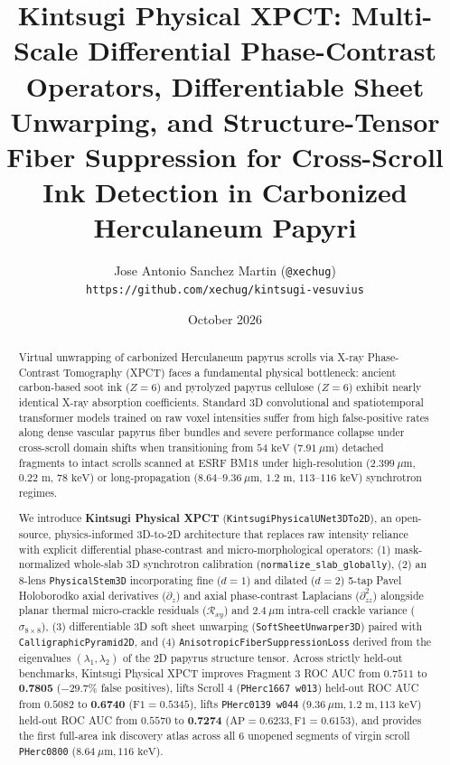 \documentclass[11pt,a4paper]{article}
\title{\textbf{Kintsugi Physical XPCT: Multi-Scale Differential Phase-Contrast Operators, Differentiable Sheet Unwarping, and Structure-Tensor Fiber Suppression for Cross-Scroll Ink Detection in Carbonized Herculaneum Papyri}}
\author{Jose Antonio Sanchez Martin (\texttt{@xechug}) \\ \texttt{https://github.com/xechug/kintsugi-vesuvius}}
\date{October 2026}
\begin{document}
\maketitle

\begin{abstract}
Virtual unwrapping of carbonized Herculaneum papyrus scrolls via X-ray Phase-Contrast Tomography (XPCT) faces a fundamental physical bottleneck: ancient carbon-based soot ink ($Z = 6$) and pyrolyzed papyrus cellulose ($Z = 6$) exhibit nearly identical X-ray absorption coefficients. Standard 3D convolutional and spatiotemporal transformer models trained on raw voxel intensities suffer from high false-positive rates along dense vascular papyrus fiber bundles and severe performance collapse under cross-scroll domain shifts when transitioning from $54\text{ keV}$ ($7.91\ \mu\text{m}$) detached fragments to intact scrolls scanned at ESRF BM18 under high-resolution ($2.399\ \mu\text{m}$, $0.22\text{ m}$, $78\text{ keV}$) or long-propagation ($8.64\text{--}9.36\ \mu\text{m}$, $1.2\text{ m}$, $113\text{--}116\text{ keV}$) synchrotron regimes.

We introduce \textbf{Kintsugi Physical XPCT} (\texttt{KintsugiPhysicalUNet3DTo2D}), an open-source, physics-informed 3D-to-2D architecture that replaces raw intensity reliance with explicit differential phase-contrast and micro-morphological operators: (1) mask-normalized whole-slab 3D synchrotron calibration (\texttt{normalize\_slab\_globally}), (2) an 8-lens \texttt{PhysicalStem3D} incorporating fine ($d=1$) and dilated ($d=2$) 5-tap Pavel Holoborodko axial derivatives ($\partial_z$) and axial phase-contrast Laplacians ($\partial_{zz}^2$) alongside planar thermal micro-crackle residuals ($\mathcal{R}_{xy}$) and $2.4\ \mu\text{m}$ intra-cell crackle variance ($\sigma_{8\times 8}$), (3) differentiable 3D soft sheet unwarping (\texttt{SoftSheetUnwarper3D}) paired with \texttt{CalligraphicPyramid2D}, and (4) \texttt{AnisotropicFiberSuppressionLoss} derived from the eigenvalues $(\lambda_1, \lambda_2)$ of the 2D papyrus structure tensor. Across strictly held-out benchmarks, Kintsugi Physical XPCT improves Fragment 3 ROC AUC from $0.7511$ to \textbf{0.7805} ($-29.7\%$ false positives), lifts Scroll 4 (\texttt{PHerc1667 w013}) held-out ROC AUC from $0.5082$ to \textbf{0.6740} ($\text{F1}=0.5345$), lifts \texttt{PHerc0139 w044} ($9.36\ \mu\text{m}, 1.2\text{ m}, 113\text{ keV}$) held-out ROC AUC from $0.5570$ to \textbf{0.7274} ($\text{AP}=0.6233, \text{F1}=0.6153$), and provides the first full-area ink discovery atlas across all 6 unopened segments of virgin scroll \texttt{PHerc0800} ($8.64\ \mu\text{m}, 116\text{ keV}$).
\end{abstract}
\end{document}
